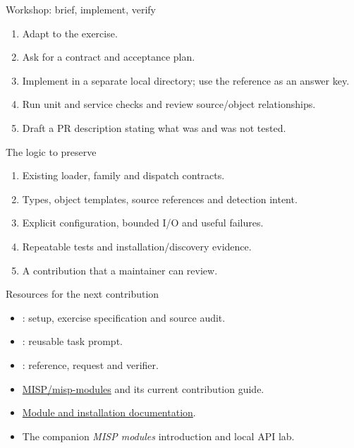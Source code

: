 \begin{frame}{Workshop: brief, implement, verify}
    \begin{enumerate}
        \item Adapt  to the exercise.
        \item Ask for a contract and acceptance plan.
        \item Implement in a separate local directory; use the reference as an answer key.
        \item Run unit and service checks and review source/object relationships.
        \item Draft a PR description stating what was and was not tested.
    \end{enumerate}
\end{frame}

\begin{frame}{The logic to preserve}
    \begin{enumerate}
        \item Existing loader, family and dispatch contracts.
        \item Types, object templates, source references and detection intent.
        \item Explicit configuration, bounded I/O and useful failures.
        \item Repeatable tests and installation/discovery evidence.
        \item A contribution that a maintainer can review.
    \end{enumerate}
\end{frame}

\begin{frame}{Resources for the next contribution}
    \begin{itemize}
        \item {}: setup, exercise specification and source audit.
        \item {}: reusable task prompt.
        \item {}: reference, request and verifier.
        \item \href{https://github.com/MISP/misp-modules}{MISP/misp-modules} and its current contribution guide.
        \item \href{https://misp.github.io/misp-modules/}{Module and installation documentation}.
        \item The companion \emph{MISP modules} introduction and local API lab.
    \end{itemize}
\end{frame}
